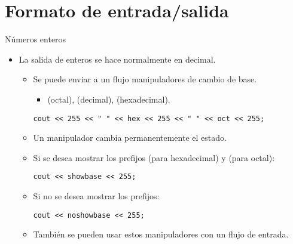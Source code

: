 \section{Formato de entrada/salida}

\begin{frame}[t,fragile]{Números enteros}
\begin{itemize}
  \item La salida de enteros se hace normalmente en decimal.
    \begin{itemize}
      \item Se puede enviar a un flujo manipuladores de cambio de base.
        \begin{itemize}
          \item {} (octal),  (decimal),  (hexadecimal).
        \end{itemize}
\begin{lstlisting}
cout << 255 << " " << hex << 255 << " " << oct << 255;
\end{lstlisting}

      \item Un manipulador cambia permanentemente el estado.

      \item Si se desea mostrar los prefijos 
             (para hexadecimal) y 
             (para octal):
\begin{lstlisting}
cout << showbase << 255;
\end{lstlisting}

      \item Si no se desea mostrar los prefijos:
\begin{lstlisting}
cout << noshowbase << 255;
\end{lstlisting}

      \item También se pueden usar estos manipuladores con un flujo de entrada.
    \end{itemize}
\end{itemize}
\end{frame}


